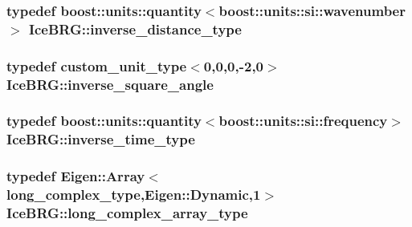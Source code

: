 \subsubsection[{inverse\+\_\+distance\+\_\+type}]{\setlength{\rightskip}{0pt plus 5cm}typedef boost\+::units\+::quantity$<$boost\+::units\+::si\+::wavenumber$>$ {\bf Ice\+B\+R\+G\+::inverse\+\_\+distance\+\_\+type}}\label{namespaceIceBRG_a2d5122b3cac0d29c24c8b92645057638}
\hypertarget{namespaceIceBRG_a26efaff9c9adf346c7d09d0b714731f6}{}
\subsubsection[{inverse\+\_\+square\+\_\+angle}]{\setlength{\rightskip}{0pt plus 5cm}typedef {\bf custom\+\_\+unit\+\_\+type}$<$0,0,0,-\/2,0$>$ {\bf Ice\+B\+R\+G\+::inverse\+\_\+square\+\_\+angle}}\label{namespaceIceBRG_a26efaff9c9adf346c7d09d0b714731f6}
\hypertarget{namespaceIceBRG_a92c76f9b2ac706653b9b12c36904712c}{}
\subsubsection[{inverse\+\_\+time\+\_\+type}]{\setlength{\rightskip}{0pt plus 5cm}typedef boost\+::units\+::quantity$<$boost\+::units\+::si\+::frequency$>$ {\bf Ice\+B\+R\+G\+::inverse\+\_\+time\+\_\+type}}\label{namespaceIceBRG_a92c76f9b2ac706653b9b12c36904712c}
\hypertarget{namespaceIceBRG_acf641fef465eff0b8d32ec8895129d26}{}
\subsubsection[{long\+\_\+complex\+\_\+array\+\_\+type}]{\setlength{\rightskip}{0pt plus 5cm}typedef Eigen\+::\+Array$<${\bf long\+\_\+complex\+\_\+type},Eigen\+::\+Dynamic,1$>$ {\bf Ice\+B\+R\+G\+::long\+\_\+complex\+\_\+array\+\_\+type}}\label{namespaceIceBRG_acf641fef465eff0b8d32ec8895129d26}
\hypertarget{namespaceIceBRG_a92601c7ccb2563723f800de23ba666a6}{}
